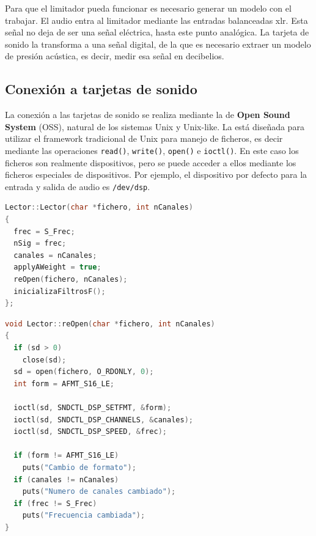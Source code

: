 Para que el limitador pueda funcionar es necesario generar un modelo con el trabajar. El audio entra al limitador mediante las entradas balanceadas \acrshort{xlr}. Esta señal no deja de ser una señal eléctrica, hasta este punto analógica. La tarjeta de sonido la transforma a una señal digital, de la que es necesario extraer un modelo de presión acústica, es decir, medir esa señal en decibelios.

\subsection{Conexión a tarjetas de sonido}

La conexión a las tarjetas de sonido se realiza mediante la  de \textbf{Open Sound System} (\acrshort{OSS}), natural de los sistemas Unix y Unix-like. La  está diseñada para utilizar el framework tradicional de Unix para manejo de ficheros, es decir mediante las operaciones \verb|read()|, \verb|write()|, \verb|open()| e \verb|ioctl()|. En este caso los ficheros son realmente dispositivos, pero se puede acceder a ellos mediante los ficheros especiales de dispositivos. Por ejemplo, el dispositivo por defecto para la entrada y salida de audio es \verb|/dev/dsp|. \\

\begin{lstlisting}[language=c++, label={lst:lms7-lector-constructor}, caption={Constructor de la clase Lector.}]
Lector::Lector(char *fichero, int nCanales)
{
  frec = S_Frec;
  nSig = frec;
  canales = nCanales;
  applyAWeight = true;
  reOpen(fichero, nCanales);
  inicializaFiltrosF();
};

\end{lstlisting}

\vspace{1em}

\begin{lstlisting}[language=c++, label={lst:lms7-lector-constructor}, caption={Apertura de un dispositivo de audio en el \acrshort{LM7}.}]
void Lector::reOpen(char *fichero, int nCanales)
{
  if (sd > 0)
    close(sd);
  sd = open(fichero, O_RDONLY, 0);
  int form = AFMT_S16_LE;

  ioctl(sd, SNDCTL_DSP_SETFMT, &form);
  ioctl(sd, SNDCTL_DSP_CHANNELS, &canales);
  ioctl(sd, SNDCTL_DSP_SPEED, &frec);

  if (form != AFMT_S16_LE)
    puts("Cambio de formato");
  if (canales != nCanales)
    puts("Numero de canales cambiado");
  if (frec != S_Frec)
    puts("Frecuencia cambiada");
}
\end{lstlisting}

